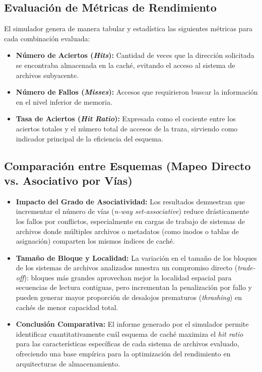 \documentclass[12pt,a4paper]{article}
\begin{document}
\subsection{Evaluación de Métricas de Rendimiento}
El simulador genera de manera tabular y estadística las siguientes métricas para cada combinación evaluada:
\begin{itemize}
    \item \textbf{Número de Aciertos (\textit{Hits}):} Cantidad de veces que la dirección solicitada se encontraba almacenada en la caché, evitando el acceso al sistema de archivos subyacente.
    \item \textbf{Número de Fallos (\textit{Misses}):} Accesos que requirieron buscar la información en el nivel inferior de memoria.
    \item \textbf{Tasa de Aciertos (\textit{Hit Ratio}):} Expresada como el cociente entre los aciertos totales y el número total de accesos de la traza, sirviendo como indicador principal de la eficiencia del esquema.
\end{itemize}

\subsection{Comparación entre Esquemas (Mapeo Directo vs. Asociativo por Vías)}
\begin{itemize}
    \item \textbf{Impacto del Grado de Asociatividad:} Los resultados demuestran que incrementar el número de vías (\textit{n-way set-associative}) reduce drásticamente los fallos por conflictos, especialmente en cargas de trabajo de sistemas de archivos donde múltiples archivos o metadatos (como inodos o tablas de asignación) comparten los mismos índices de caché.
    \item \textbf{Tamaño de Bloque y Localidad:} La variación en el tamaño de los bloques de los sistemas de archivos analizados muestra un compromiso directo (\textit{trade-off}): bloques más grandes aprovechan mejor la localidad espacial para secuencias de lectura contiguas, pero incrementan la penalización por fallo y pueden generar mayor proporción de desalojos prematuros (\textit{thrashing}) en cachés de menor capacidad total.
    \item \textbf{Conclusión Comparativa:} El informe generado por el simulador permite identificar cuantitativamente cuál esquema de caché maximiza el \textit{hit ratio} para las características específicas de cada sistema de archivos evaluado, ofreciendo una base empírica para la optimización del rendimiento en arquitecturas de almacenamiento. 
\end{itemize}
\end{document}

